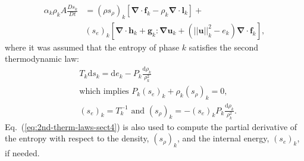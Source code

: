 \documentclass[preprint,10pt]{elsarticle}
\renewcommand{\div}{\mbold{\nabla}\! \cdot \!}
\newcommand{\grad}{\mbold{\nabla}}
\newcommand{\mbold}[1]{\boldsymbol#1}
\newcommand{\eqt}[1]{Eq.~(\ref{#1})}                     %
\begin{document}
%
\begin{align}\label{eq:ent-res-7-eqn-diss-terms}
\alpha_k \rho_k A \frac{Ds_k}{Dt} &=  (\rho s_\rho)_k \left[ \div \mbold f_k - \rho_k \div \mbold l_k \right] + \nonumber \\
&\left(s_e\right)_k \left[ \div \mbold h_k + \mbold g_k : \grad \mbold u_k +  \left( || \mbold u ||^2_k - e_k\right) \div \mbold f_k  \right],
\end{align}
%
where it was assumed that the entropy of phase $k$ satisfies the second thermodynamic law: 
%
\begin{align}\label{eq:2nd-therm-laws-sect4}
&T_k \text{d} s_k = \text{d}e_k - P_k\frac{\text{d}\rho_k}{\rho_k^2} \nonumber \\
& \text{which implies } P_k (s_e)_k + \rho_k (s_\rho)_k = 0, \\
& (s_e)_k = T_k^{-1} \text{ and } (s_\rho)_k = - (s_e)_k P_k \frac{\text{d}\rho_k}{\rho_k^2}. \nonumber
\end{align}
% 
\eqt{eq:2nd-therm-laws-sect4} is also used to compute the partial derivative of the entropy with respect to the density, $(s_\rho)_k$, and the internal energy, $(s_e)_k$, if needed.
\end{document}
